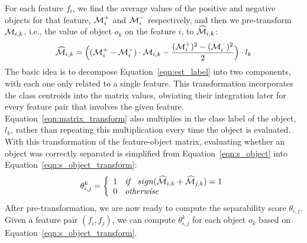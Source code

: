  For each feature $f_i$, we find the average values of the positive and negative objects for that feature, ${\mathcal{M}}_i^+$ and ${\mathcal{M}}_i^-$ respectively, and then we pre-transform ${\mathcal{M}}_{i,k}$, i.e., the value of object $o_k$ on the feature $i$, to $\widehat{{\mathcal{M}}}_{i,k}$:
\begin{equation}\label{eqn:matrix_transform}
\widehat{{\mathcal{M}}}_{i,k} = \Big( ({\mathcal{M}}_i^+-{\mathcal{M}}_i^-)\cdot {\mathcal{M}}_{i,k}-\frac{({\mathcal{M}}_i^+)^2-({\mathcal{M}}_i^-)^2}{2} \Big) \cdot l_k
\end{equation}
\noindent The basic idea is to decompose 
Equation~\ref{eqn:est_label} into two components, 
with each one only related to a single feature. 
This transformation incorporates 
the class centroids into the matrix values, 
obviating their integration later 
for every feature pair that involves the given feature. 
Equation~\ref{eqn:matrix_transform} also multiplies 
in the class label of the object, $l_k$, 
rather than repeating this multiplication every time the object is evaluated. With this transformation of the feature-object matrix, 
evaluating whether an object was correctly separated is simplified from Equation~\ref{eqn:s_object} into Equation~\ref{eqn:s_object_transform}:
\begin{equation}\label{eqn:s_object_transform}
\theta_{i,j}^{k}=\left\{
 \begin{array}{ll}
  1 \textit{\hspace{2mm} if \hspace{2mm}} sign(\widehat{{\mathcal{M}}}_{i,k} + \widehat{{\mathcal{M}}}_{j,k}) = 1\\
  0 \textit{\hspace{2mm} otherwise \hspace{2mm}}
 \end{array}
 \right.
\end{equation}
After pre-transformation, we are now ready 
to compute the separability score $\theta_{i,j}$. 
Given a feature pair $(f_i,f_j)$, we can compute $\theta_{i,j}^{k}$ 
for each object $o_k$ based on Equation~\ref{eqn:s_object_transform}. 
